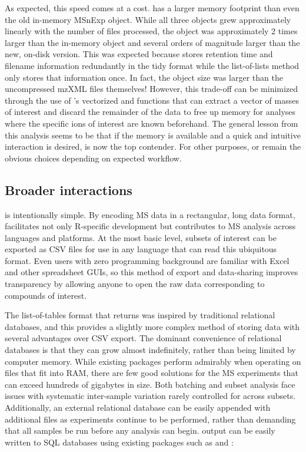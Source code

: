 As expected, this speed comes at a cost.  has a larger memory footprint than even the old in-memory MSnExp object. While all three objects grew approximately linearly with the number of files processed, the  object was approximately 2 times larger than the in-memory  object and several orders of magnitude larger than the new, on-disk version. This was expected because  stores retention time and filename information redundantly in the tidy format while the list-of-lists method only stores that information once. In fact, the  object size was larger than the uncompressed mzXML files themselves! However, this trade-off can be minimized through the use of 's vectorized  and  functions that can extract a vector of masses of interest and discard the remainder of the data to free up memory for analyses where the specific ions of interest are known beforehand. The general lesson from this analysis seems to be that if the memory is available and a quick and intuitive interaction is desired,  is now the top contender. For other purposes,  or  remain the obvious choices depending on expected workflow.

\subsection{Broader interactions}

 is intentionally simple. By encoding MS data in a rectangular, long data format,  facilitates not only R-specific development but contributes to MS analysis across languages and platforms. At the most basic level, subsets of interest can be exported as CSV files for use in any language that can read this ubiquitous format. Even users with zero programming background are familiar with Excel and other spreadsheet GUIs, so this method of export and data-sharing improves transparency by allowing anyone to open the raw data corresponding to compounds of interest.

The list-of-tables format that  returns was inspired by traditional relational databases, and this provides a slightly more complex method of storing data with several advantages over CSV export. The dominant convenience of relational databases is that they can grow almost indefinitely, rather than being limited by computer memory. While existing packages perform admirably when operating on files that fit into RAM, there are few good solutions for the MS experiments that can exceed hundreds of gigabytes in size. Both batching and subset analysis face issues with systematic inter-sample variation rarely controlled for across subsets. Additionally, an external relational database can be easily appended with additional files as experiments continue to be performed, rather than demanding that all samples be run before any analysis can begin.  output can be easily written to SQL databases using existing packages such as  and :

